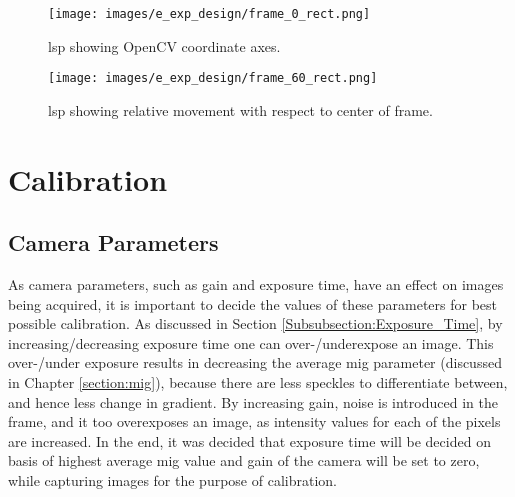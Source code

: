         \begin{figure}[h]
            \centering
            \texttt{[image: images/e\_exp\_design/frame\_0\_rect.png]}
            \caption{\gls{lsp} showing OpenCV coordinate axes.}
            \label{fig:frame_0_rect.png}
        \end{figure}
        
        \begin{figure}[h]
            \centering
            \texttt{[image: images/e\_exp\_design/frame\_60\_rect.png]}
            \caption{\gls{lsp} showing relative movement with respect to center of frame.}
            \label{fig:frame_60_rect.png}
        \end{figure}

\clearpage

\vspace{5mm}

\section{Calibration}\label{section:calibration}
\subsection*{Camera Parameters}
    As camera parameters, such as gain and exposure time, have an effect on images being acquired, it is important to decide the values of these parameters for best possible calibration. As discussed in Section \ref{Subsubsection:Exposure_Time}, by increasing/decreasing exposure time one can over-/underexpose an image. This over-/under exposure results in decreasing the average \gls{mig} parameter (discussed in Chapter \ref{section:mig}), because there are less speckles to differentiate between, and hence less change in gradient. By increasing gain, noise is introduced in the frame, and it too overexposes an image, as intensity values for each of the pixels are increased. In the end, it was decided that exposure time will be decided on basis of highest average \gls{mig} value and gain of the camera will be set to zero, while capturing images for the purpose of calibration.

